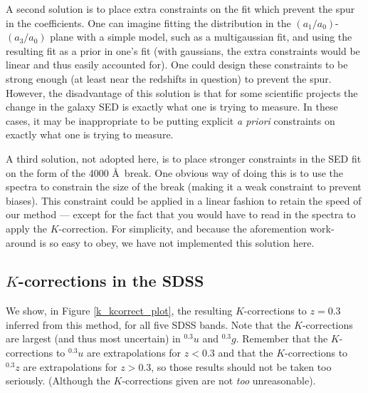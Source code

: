 \documentclass[10pt,preprint]{aastex}
\newcommand{\band}[2]{\ensuremath{^{#1}\!{#2}}}
\begin{document}
A second solution is to place extra constraints on the fit which
prevent the spur in the coefficients. One can imagine fitting the
distribution in the $(a_1/a_0)$-$(a_3/a_0)$ plane with a simple model,
such as a multigaussian fit, and using the resulting fit as a prior in
one's fit (with gaussians, the extra constraints would be linear and
thus easily accounted for). One could design these constraints to be
strong enough (at least near the redshifts in question) to prevent the
spur. However, the disadvantage of this solution is that for some
scientific projects the change in the galaxy SED is exactly what one
is trying to measure. In these cases, it may be inappropriate to be
putting explicit {\it a priori} constraints on exactly what one is
trying to measure.

A third solution, not adopted here, is to place stronger constraints
in the SED fit on the form of the 4000 \AA\ break. One obvious way of
doing this is to use the spectra to constrain the size of the break
(making it a weak constraint to prevent biases). This constraint could
be applied in a linear fashion to retain the speed of our method ---
except for the fact that you would have to read in the spectra to
apply the $K$-correction. For simplicity, and because the aforemention
work-around is so easy to obey, we have not implemented this solution
here.

\subsection{$K$-corrections in the SDSS}

We show, in Figure \ref{k_kcorrect_plot}, the resulting $K$-corrections to
$z=0.3$ inferred from this method, for all five SDSS bands. Note that
the $K$-corrections are largest (and thus most uncertain) in
$\band{0.3}{u}$ and $\band{0.3}{g}$. Remember that the $K$-corrections
to $\band{0.3}{u}$ are extrapolations for $z<0.3$ and that the
$K$-corrections to $\band{0.3}{z}$ are extrapolations for $z>0.3$, so
those results should not be taken too seriously. (Although the
$K$-corrections given are not {\it too} unreasonable).
\end{document}

